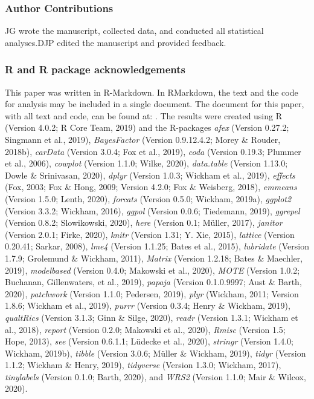 \documentclass[
  english,
  jou]{apa7}
\begin{document}
\hypertarget{author-contributions}{%
\subsubsection{Author Contributions}\label{author-contributions}}

JG wrote the manuscript, collected data, and conducted all statistical analyses.DJP edited the manuscript and provided feedback.
\newline

\hypertarget{r-and-r-package-acknowledgements}{%
\subsubsection{R and R package acknowledgements}\label{r-and-r-package-acknowledgements}}

This paper was written in R-Markdown. In RMarkdown, the text and the code for analysis may
be included in a single document. The document for this paper, with all text and code, can be found at: . The results were created using R (Version 4.0.2; R Core Team, 2019) and the R-packages \emph{afex} (Version 0.27.2; Singmann et al., 2019), \emph{BayesFactor} (Version 0.9.12.4.2; Morey \& Rouder, 2018b), \emph{carData} (Version 3.0.4; Fox et al., 2019), \emph{coda} (Version 0.19.3; Plummer et al., 2006), \emph{cowplot} (Version 1.1.0; Wilke, 2020), \emph{data.table} (Version 1.13.0; Dowle \& Srinivasan, 2020), \emph{dplyr} (Version 1.0.3; Wickham et al., 2019), \emph{effects} (Fox, 2003; Fox \& Hong, 2009; Version 4.2.0; Fox \& Weisberg, 2018), \emph{emmeans} (Version 1.5.0; Lenth, 2020), \emph{forcats} (Version 0.5.0; Wickham, 2019a), \emph{ggplot2} (Version 3.3.2; Wickham, 2016), \emph{ggpol} (Version 0.0.6; Tiedemann, 2019), \emph{ggrepel} (Version 0.8.2; Slowikowski, 2020), \emph{here} (Version 0.1; Müller, 2017), \emph{janitor} (Version 2.0.1; Firke, 2020), \emph{knitr} (Version 1.31; Y. Xie, 2015), \emph{lattice} (Version 0.20.41; Sarkar, 2008), \emph{lme4} (Version 1.1.25; Bates et al., 2015), \emph{lubridate} (Version 1.7.9; Grolemund \& Wickham, 2011), \emph{Matrix} (Version 1.2.18; Bates \& Maechler, 2019), \emph{modelbased} (Version 0.4.0; Makowski et al., 2020), \emph{MOTE} (Version 1.0.2; Buchanan, Gillenwaters, et al., 2019), \emph{papaja} (Version 0.1.0.9997; Aust \& Barth, 2020), \emph{patchwork} (Version 1.1.0; Pedersen, 2019), \emph{plyr} (Wickham, 2011; Version 1.8.6; Wickham et al., 2019), \emph{purrr} (Version 0.3.4; Henry \& Wickham, 2019), \emph{qualtRics} (Version 3.1.3; Ginn \& Silge, 2020), \emph{readr} (Version 1.3.1; Wickham et al., 2018), \emph{report} (Version 0.2.0; Makowski et al., 2020), \emph{Rmisc} (Version 1.5; Hope, 2013), \emph{see} (Version 0.6.1.1; Lüdecke et al., 2020), \emph{stringr} (Version 1.4.0; Wickham, 2019b), \emph{tibble} (Version 3.0.6; Müller \& Wickham, 2019), \emph{tidyr} (Version 1.1.2; Wickham \& Henry, 2019), \emph{tidyverse} (Version 1.3.0; Wickham, 2017), \emph{tinylabels} (Version 0.1.0; Barth, 2020), and \emph{WRS2} (Version 1.1.0; Mair \& Wilcox, 2020).
\end{document}
